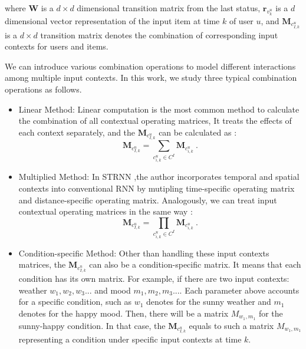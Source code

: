 \documentclass[conference]{IEEEtran}
\begin{document}
where  $\textbf{W}$ is a $d\times d$ dimensional transition matrix from the last status, $\textbf{r}_{v_{k}^{u}}$ is a  $d$ dimensional vector representation of the input item at time $k$ of user $u$, and $\textbf{M}_{c_{I,k}^{u}}$ is a  $d\times d$ transition matrix denotes the combination of corresponding input contexts for users and items.  

We can introduce various combination operations to model different interactions among multiple input contexts. In this work, we study three typical combination operations as follows.

\begin{itemize}
\item Linear Method: Linear computation is the most common method to calculate the combination of all contextual operating matrices, It treats the effects of each context separately, and the $\textbf{M}_{c_{I,k}^{u}}$ can be calculated as :
\begin{equation} \label{eqMadd}
\textbf{M}_{c_{I,k}^{u}} = \sum_{c_{i,k}^{u}\in C^I} \textbf{M}_{c_{i,k}^{u}} ~.
\end{equation}

\item Multiplied Method: In STRNN  \cite{liu2016strnn} ,the author incorporates temporal and spatial contexts into conventional RNN by mutipling time-specific operating matrix and distance-specific operating matrix. Analogously, we can treat input contextual operating matrices in the same way :
\begin{equation}
\textbf{M}_{c_{I,k}^{u}} = \prod_{c_{i,k}^{u}\in C^I} \textbf{M}_{c_{i,k}^{u}} ~.
\end{equation}

\item Condition-specific Method: Other than handling these input contexts matrices, the $\textbf{M}_{c_{I,k}^{u}}$ can also be a condition-specific matrix. It means that each condition has its own matrix. For example, if there are two input contexts: weather ${w_1,w_2,w_3...}$ and mood ${m_1,m_2,m_3...}$. Each parameter above accounts for a specific condition, such as $w_1$ denotes for the sunny weather and $m_1$ denotes for the happy mood. Then, there will be a matrix $M_{w_1,m_1}$ for the sunny-happy condition. In that case, the $\textbf{M}_{c_{I,k}^{u}}$ equals to such a matrix $M_{w_1,m_1}$ representing a condition under specific input contexts at time $k$. 

\end{itemize}
\end{document}
